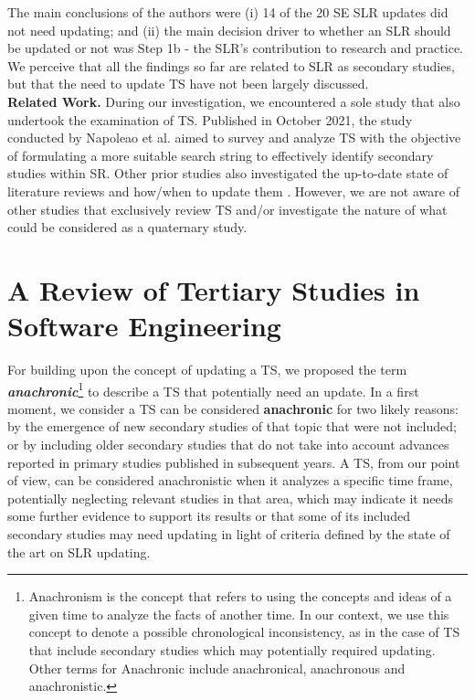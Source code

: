 \documentclass[sigconf]{acmart}
\begin{document}
The main conclusions of the authors were (i) 14  of  the  20  SE  SLR  updates  did  not  need updating; and (ii) the main decision driver to whether an SLR should be updated or not was Step 1b - the SLR’s contribution to research and practice. We perceive that all the findings so far are related to SLR as secondary studies, but that the need to update TS have not been largely discussed.
\\
\noindent \textbf{Related Work.} During our investigation, we encountered a sole study that also undertook the examination of TS. Published in October 2021, the study conducted by Napoleao et al. \cite{Napoleao2021} aimed to survey and analyze TS with the objective of formulating a more suitable search string to effectively identify secondary studies within SR. Other prior studies also investigated the up-to-date state of literature reviews and how/when to update them \cite{felizardo:2016update,Mendes2020}. However, we are not aware of other studies that exclusively review  TS and/or investigate the nature of what could be considered as a quaternary study. 

\section{A Review of Tertiary Studies in Software Engineering}
\label{sec:propsolution}

For building upon the concept of updating a TS, we proposed the term \textit{\textbf{anachronic}}\footnote{Anachronism is the concept that refers to using the concepts and ideas of a given time to analyze the facts of another time. In our context, we use this concept to denote a possible chronological inconsistency, as in the case of TS that include secondary studies which may potentially required updating. Other terms for Anachronic include anachronical, anachronous and anachronistic.} to describe a TS that potentially need an update. In a first moment, we consider a TS can be considered \textbf{anachronic} for two likely reasons: by the emergence of new secondary studies of that topic that were not included; or by including older secondary studies that do not take into account advances reported in primary studies published in subsequent years. A TS, from our point of view, can be considered anachronistic when it analyzes a specific time frame, potentially neglecting relevant studies in that area, which may indicate it needs some further evidence to support its results or that some of its included secondary studies may need updating in light of
criteria defined by the state of the art on SLR updating.
\end{document}
